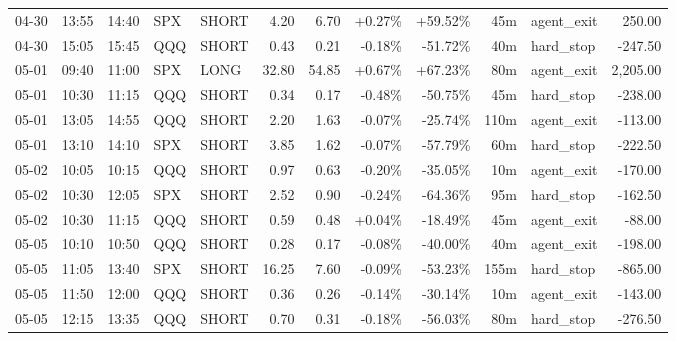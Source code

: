 \documentclass[11pt,a4paper,twoside]{article}
\begin{document}
\begin{center}
\begin{longtable}{>{\color{txtmain}}l l l l l r r r r r >{\color{txtmain}}l r}
04-30 & 13:55 & 14:40 & SPX & SHORT & 4.20 & 6.70 & \textcolor{wingreen}{+0.27\%} & \textcolor{wingreen}{+59.52\%} & 45m & agent\_exit & \textcolor{wingreen}{250.00} \\
04-30 & 15:05 & 15:45 & QQQ & SHORT & 0.43 & 0.21 & \textcolor{lossred}{-0.18\%} & \textcolor{lossred}{-51.72\%} & 40m & hard\_stop & \textcolor{lossred}{-247.50} \\
05-01 & 09:40 & 11:00 & SPX & LONG & 32.80 & 54.85 & \textcolor{wingreen}{+0.67\%} & \textcolor{wingreen}{+67.23\%} & 80m & agent\_exit & \textcolor{wingreen}{2,205.00} \\
05-01 & 10:30 & 11:15 & QQQ & SHORT & 0.34 & 0.17 & \textcolor{lossred}{-0.48\%} & \textcolor{lossred}{-50.75\%} & 45m & hard\_stop & \textcolor{lossred}{-238.00} \\
05-01 & 13:05 & 14:55 & QQQ & SHORT & 2.20 & 1.63 & \textcolor{lossred}{-0.07\%} & \textcolor{lossred}{-25.74\%} & 110m & agent\_exit & \textcolor{lossred}{-113.00} \\
05-01 & 13:10 & 14:10 & SPX & SHORT & 3.85 & 1.62 & \textcolor{lossred}{-0.07\%} & \textcolor{lossred}{-57.79\%} & 60m & hard\_stop & \textcolor{lossred}{-222.50} \\
05-02 & 10:05 & 10:15 & QQQ & SHORT & 0.97 & 0.63 & \textcolor{lossred}{-0.20\%} & \textcolor{lossred}{-35.05\%} & 10m & agent\_exit & \textcolor{lossred}{-170.00} \\
05-02 & 10:30 & 12:05 & SPX & SHORT & 2.52 & 0.90 & \textcolor{lossred}{-0.24\%} & \textcolor{lossred}{-64.36\%} & 95m & hard\_stop & \textcolor{lossred}{-162.50} \\
05-02 & 10:30 & 11:15 & QQQ & SHORT & 0.59 & 0.48 & \textcolor{wingreen}{+0.04\%} & \textcolor{lossred}{-18.49\%} & 45m & agent\_exit & \textcolor{lossred}{-88.00} \\
05-05 & 10:10 & 10:50 & QQQ & SHORT & 0.28 & 0.17 & \textcolor{lossred}{-0.08\%} & \textcolor{lossred}{-40.00\%} & 40m & agent\_exit & \textcolor{lossred}{-198.00} \\
05-05 & 11:05 & 13:40 & SPX & SHORT & 16.25 & 7.60 & \textcolor{lossred}{-0.09\%} & \textcolor{lossred}{-53.23\%} & 155m & hard\_stop & \textcolor{lossred}{-865.00} \\
05-05 & 11:50 & 12:00 & QQQ & SHORT & 0.36 & 0.26 & \textcolor{lossred}{-0.14\%} & \textcolor{lossred}{-30.14\%} & 10m & agent\_exit & \textcolor{lossred}{-143.00} \\
05-05 & 12:15 & 13:35 & QQQ & SHORT & 0.70 & 0.31 & \textcolor{lossred}{-0.18\%} & \textcolor{lossred}{-56.03\%} & 80m & hard\_stop & \textcolor{lossred}{-276.50} \\

\end{longtable}
\end{center}
\end{document}
